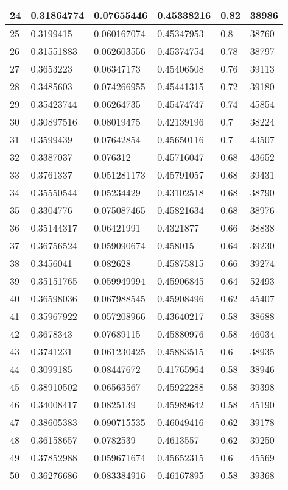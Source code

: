 \begin{longtable}{|l|l|l|l|l|l|}
24 & 0.31864774 & 0.07655446 & 0.45338216 & 0.82 & 38986 \\ \hline 
25 & 0.3199415 & 0.060167074 & 0.45347953 & 0.8 & 38760 \\ \hline 
26 & 0.31551883 & 0.062603556 & 0.45374754 & 0.78 & 38797 \\ \hline 
27 & 0.3653223 & 0.06347173 & 0.45406508 & 0.76 & 39113 \\ \hline 
28 & 0.3485603 & 0.074266955 & 0.45441315 & 0.72 & 39180 \\ \hline 
29 & 0.35423744 & 0.06264735 & 0.45474747 & 0.74 & 45854 \\ \hline 
30 & 0.30897516 & 0.08019475 & 0.42139196 & 0.7 & 38224 \\ \hline 
31 & 0.3599439 & 0.07642854 & 0.45650116 & 0.7 & 43507 \\ \hline 
32 & 0.3387037 & 0.076312 & 0.45716047 & 0.68 & 43652 \\ \hline 
33 & 0.3761337 & 0.051281173 & 0.45791057 & 0.68 & 39431 \\ \hline 
34 & 0.35550544 & 0.05234429 & 0.43102518 & 0.68 & 38790 \\ \hline 
35 & 0.3304776 & 0.075087465 & 0.45821634 & 0.68 & 38976 \\ \hline 
36 & 0.35144317 & 0.06421991 & 0.4321877 & 0.66 & 38838 \\ \hline 
37 & 0.36756524 & 0.059090674 & 0.458015 & 0.64 & 39230 \\ \hline 
38 & 0.3456041 & 0.082628 & 0.45875815 & 0.66 & 39274 \\ \hline 
39 & 0.35151765 & 0.059949994 & 0.45906845 & 0.64 & 52493 \\ \hline 
40 & 0.36598036 & 0.067988545 & 0.45908496 & 0.62 & 45407 \\ \hline 
41 & 0.35967922 & 0.057208966 & 0.43640217 & 0.58 & 38688 \\ \hline 
42 & 0.3678343 & 0.07689115 & 0.45880976 & 0.58 & 46034 \\ \hline 
43 & 0.3741231 & 0.061230425 & 0.45883515 & 0.6 & 38935 \\ \hline 
44 & 0.3099185 & 0.08447672 & 0.41765964 & 0.58 & 38946 \\ \hline 
45 & 0.38910502 & 0.06563567 & 0.45922288 & 0.58 & 39398 \\ \hline 
46 & 0.34008417 & 0.0825139 & 0.45989642 & 0.58 & 45190 \\ \hline 
47 & 0.38605383 & 0.090715535 & 0.46049416 & 0.62 & 39178 \\ \hline 
48 & 0.36158657 & 0.0782539 & 0.4613557 & 0.62 & 39250 \\ \hline 
49 & 0.37852988 & 0.059671674 & 0.45652315 & 0.6 & 45569 \\ \hline 
50 & 0.36276686 & 0.083384916 & 0.46167895 & 0.58 & 39368 \\ \hline 
\end{longtable}